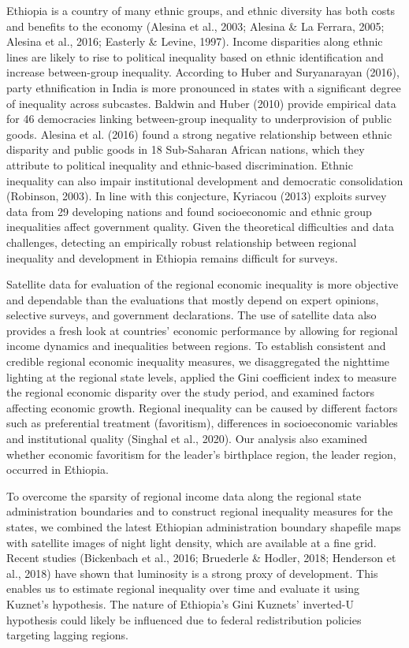 Ethiopia is a country of many ethnic groups, and ethnic diversity has
both costs and benefits to the economy (Alesina et al., 2003; Alesina \&
La Ferrara, 2005; Alesina et al., 2016; Easterly \& Levine, 1997).
Income disparities along ethnic lines are likely to rise to political
inequality based on ethnic identification and increase between-group
inequality. According to Huber and Suryanarayan (2016), party
ethnification in India is more pronounced in states with a significant
degree of inequality across subcastes. Baldwin and Huber (2010) provide
empirical data for 46 democracies linking between-group inequality to
underprovision of public goods. Alesina et al. (2016) found a strong
negative relationship between ethnic disparity and public goods in 18
Sub-Saharan African nations, which they attribute to political
inequality and ethnic-based discrimination. Ethnic inequality can also
impair institutional development and democratic consolidation (Robinson,
2003). In line with this conjecture, Kyriacou (2013) exploits survey
data from 29 developing nations and found socioeconomic and ethnic group
inequalities affect government quality. Given the theoretical
difficulties and data challenges, detecting an empirically robust
relationship between regional inequality and development in Ethiopia
remains difficult for surveys.

Satellite data for evaluation of the regional economic inequality is
more objective and dependable than the evaluations that mostly depend on
expert opinions, selective surveys, and government declarations. The use
of satellite data also provides a fresh look at countries' economic
performance by allowing for regional income dynamics and inequalities
between regions. To establish consistent and credible regional economic
inequality measures, we disaggregated the nighttime lighting at the
regional state levels, applied the Gini coefficient index to measure the
regional economic disparity over the study period, and examined factors
affecting economic growth. Regional inequality can be caused by
different factors such as preferential treatment (favoritism),
differences in socioeconomic variables and institutional quality
(Singhal et al., 2020). Our analysis also examined whether economic
favoritism for the leader's birthplace region, the leader region,
occurred in Ethiopia.

To overcome the sparsity of regional income data along the regional
state administration boundaries and to construct regional inequality
measures for the states, we combined the latest Ethiopian administration
boundary shapefile maps with satellite images of night light density,
which are available at a fine grid. Recent studies (Bickenbach et al.,
2016; Bruederle \& Hodler, 2018; Henderson et al., 2018) have shown that
luminosity is a strong proxy of development. This enables us to estimate
regional inequality over time and evaluate it using Kuznet's hypothesis.
The nature of Ethiopia's Gini Kuznets' inverted-U hypothesis could
likely be influenced due to federal redistribution policies targeting
lagging regions.

